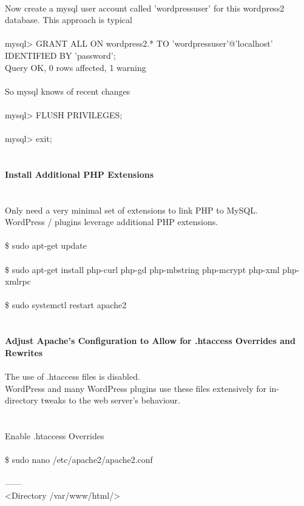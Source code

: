 \documentclass[10pt,a4paper]{article}
\begin{document}
{{{{{{{{{{{{{{{{\\
Now create a mysql user account called 'wordpressuser' for this wordpress2 database. This approach is typical\\
\\
mysql> GRANT ALL ON wordpress2.* TO 'wordpressuser}{\large '@'localhost' IDENTIFIED BY 'password}{\large ';\\
Query OK, 0 rows affected, 1 warning \\
\\
So mysql knows of recent changes\\
\\
mysql> FLUSH PRIVILEGES;\\
\\
mysql> exit;\\
\\
\\
\textbf{Install Additional PHP Extensions}}{\large \\
\\
\\
Only need a very minimal set of extensions to link PHP to MySQL. \\
WordPress / plugins leverage additional PHP extensions.\\
\\
\$ sudo apt-get update\\
\\
\$ sudo apt-get install php-curl php-gd php-mbstring php-mcrypt php-xml php-xmlrpc\\
\\
\$ sudo systemctl restart apache2\\
\\
\\
\textbf{Adjust Apache's Configuration to Allow for .htaccess Overrides and Rewrites}}{\large \\
\\
The use of .htaccess files is disabled. \\
WordPress and many WordPress plugins use these files extensively for in-directory tweaks to the web server's behaviour.\\
\\
\\
Enable .htaccess Overrides\\
\\
\$ sudo nano /etc/apache2/apache2.conf}{\large \\
\\
------\\
<Directory /var/www/html/>}{\large \\
}}}}}}}}}}}}}}}}
\end{document}
